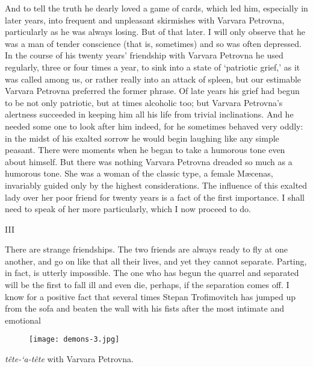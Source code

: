 \documentclass[12pt]{article}
\begin{document}
\vspace{12pt}
And to tell the truth he dearly loved a game of cards, which led him,
especially in later years, into frequent and unpleasant skirmishes with
Varvara Petrovna, particularly as he was always losing. But of that
later. I will only observe that he was a man of tender conscience (that
is, sometimes) and so was often depressed. In the course of his twenty
years' friendship with Varvara Petrovna he used regularly, three or
four times a year, to sink into a state of `patriotic grief,' as it
was called among us, or rather really into an attack of spleen, but our
estimable Varvara Petrovna preferred the former phrase. Of late years
his grief had begun to be not only patriotic, but at times alcoholic
too; but Varvara Petrovna's alertness succeeded in keeping him all his
life from trivial inclinations. And he needed some one to look after him
indeed, for he sometimes behaved very oddly: in the midst of his exalted
sorrow he would begin laughing like any simple peasant. There were
moments when he began to take a humorous tone even about himself. But
there was nothing Varvara Petrovna dreaded so much as a humorous tone.
She was a woman of the classic type, a female Mæcenas, invariably
guided only by the highest considerations. The influence of this exalted
lady over her poor friend for twenty years is a fact of the first
importance. I shall need to speak of her more particularly, which I now
proceed to do.



\vspace{12pt}
III


\vspace{12pt}
There are strange friendships. The two friends are always ready to fly
at one another, and go on like that all their lives, and yet they cannot
separate. Parting, in fact, is utterly impossible. The one who has begun
the quarrel and separated will be the first to fall ill and even die,
perhaps, if the separation comes off. I know for a positive fact that
several times Stepan Trofimovitch has jumped up from the sofa and
beaten the wall with his fists after the most intimate and emotional
\begin{figure}[!ht]
\begin{center}
\texttt{[image: demons-3.jpg]}
\end{center}
\end{figure}
\emph{t\^ete-`a-t\^ete} with Varvara Petrovna.
\end{document}
